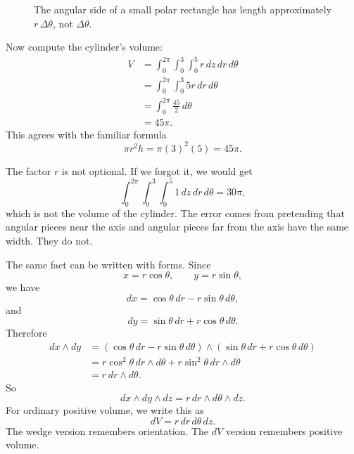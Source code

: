 \begin{figure}[h]
\centering
{}
\caption{The angular side of a small polar rectangle has length approximately
\(r\,\Delta\theta\), not \(\Delta\theta\).}
\end{figure}

Now compute the cylinder's volume:
\[
\begin{aligned}
V
&=
\int_0^{2\pi}\int_0^3\int_0^5 r\,dz\,dr\,d\theta\\
&=
\int_0^{2\pi}\int_0^3 5r\,dr\,d\theta\\
&=
\int_0^{2\pi} \frac{45}{2}\,d\theta\\
&=
45\pi.
\end{aligned}
\]
This agrees with the familiar formula
\[
    \pi r^2h=\pi(3)^2(5)=45\pi.
\]

The factor \(r\) is not optional.  If we forgot it, we would get
\[
    \int_0^{2\pi}\int_0^3\int_0^5 1\,dz\,dr\,d\theta=30\pi,
\]
which is not the volume of the cylinder.  The error comes from pretending that angular
pieces near the axis and angular pieces far from the axis have the same width.  They
do not.

The same fact can be written with forms.  Since
\[
    x=r\cos\theta,
    \qquad
    y=r\sin\theta,
\]
we have
\[
    dx=\cos\theta\,dr-r\sin\theta\,d\theta,
\]
and
\[
    dy=\sin\theta\,dr+r\cos\theta\,d\theta.
\]
Therefore
\[
\begin{aligned}
dx\wedge dy
&=
(\cos\theta\,dr-r\sin\theta\,d\theta)
\wedge
(\sin\theta\,dr+r\cos\theta\,d\theta)\\
&=
r\cos^2\theta\,dr\wedge d\theta
+
r\sin^2\theta\,dr\wedge d\theta\\
&=
r\,dr\wedge d\theta.
\end{aligned}
\]
So
\[
\boxed{
    dx\wedge dy\wedge dz
    =
    r\,dr\wedge d\theta\wedge dz.
}
\]
For ordinary positive volume, we write this as
\[
    dV=r\,dr\,d\theta\,dz.
\]
The wedge version remembers orientation.  The \(dV\) version remembers positive
volume.

